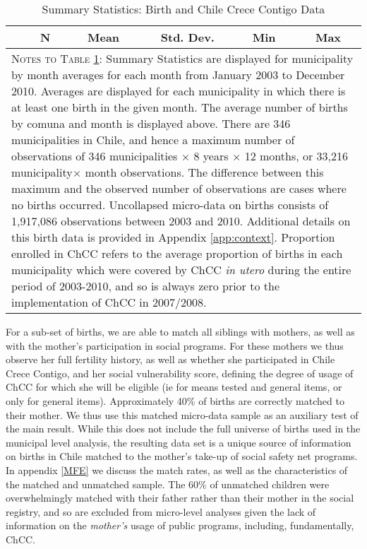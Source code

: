 \documentclass[12pt]{article}
\begin{document}
\begin{spacing}{1.4}
\begin{table}[htpb!]
  \begin{center}
    \caption{Summary Statistics: Birth and Chile Crece Contigo Data}
    \label{tab:sumstats}
    \begin{tabular}{lccccc} \toprule
      & N& Mean & Std. Dev. & Min & Max \\ \midrule
       \midrule
      \multicolumn{6}{p{14.2cm}}{{\footnotesize \textsc{Notes to Table
            \ref{tab:sumstats}}: Summary Statistics are displayed for
          municipality by month averages for
          each month from January 2003 to December 2010.  Averages are
          displayed for each municipality in which there is at least one
          birth in the given month.  The average number of births by
          comuna and month is displayed above.  There are 346 municipalities
          in Chile, and hence a maximum number of observations of 346
          municipalities $\times$ 8 years $\times$ 12 months, or 33,216
          municipality$\times$ month observations.  The difference between
          this maximum and the observed number of observations are cases
          where no births occurred.  Uncollapsed micro-data on births
          consists of 1,917,086 observations between 2003 and 2010.
          Additional details on this birth data is provided in
          Appendix \ref{app:context}.  Proportion enrolled in ChCC
          refers to the average proportion of births in each municipality
          which were covered by ChCC \emph{in utero} during the entire
          period of 2003-2010, and so is always zero prior to the implementation
          of ChCC in 2007/2008.
      }} \\ \bottomrule
      \end{tabular}
  \end{center}
\end{table}

For a sub-set of births, we are able to match all siblings with
mothers, as well as with the mother's participation in social
programs.  For these mothers we thus observe her full fertility
history, as well as whether she participated in Chile Crece Contigo,
and her social vulnerability score, defining the degree of usage
of ChCC for which she will be eligible (ie for means tested and
general items, or only for general items).  Approximately 40\% of
births are correctly matched to their mother.  We thus use this
matched micro-data sample as an auxiliary test of the main result.
While this does not include the full universe of births used in
the municipal level analysis, the resulting data set is a unique
source of information on births in Chile matched to the mother's
take-up of social safety net programs.  In appendix \ref{MFE}
we discuss the match rates, as well as the characteristics of
the matched and unmatched sample.  The 60\% of unmatched children
were overwhelmingly matched with their father rather than their
mother in the social registry, and so are excluded from micro-level
analyses given the lack of information on the \emph{mother's} usage
of public programs, including, fundamentally, ChCC.


\end{spacing}
\end{document}
